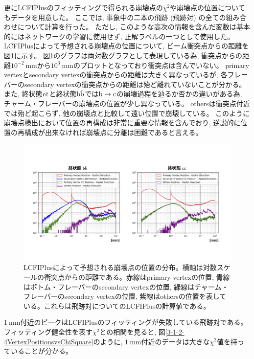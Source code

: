 更にLCFIPlusのフィッティングで得られる崩壊点の$\chi^2$や崩壊点の位置についてもデータを用意した。
ここでは, 事象中の二本の飛跡 (飛跡対) の全ての組み合わせについて計算を行った。
ただし, このような高次の情報を含んだ変数は基本的にはネットワークの学習に使用せず, 正解ラベルの一つとして使用した。
LCFIPlusによって予想される崩壊点の位置について, ビーム衝突点からの距離を図\ref{3-1-2-3VertexPositions}に示す。
図\ref{3-1-2-3VertexPositions}のグラフは両対数グラフとして表現している為, 衝突点からの距離$10^{-2}\ \mathrm{mm}$から$10^{3}\ \mathrm{mm}$のプロットとなっており衝突点は含んでいない。
primary vertexとsecondary vertexの衝突点からの距離は大きく異なっているが, 各フレーバーのsecondary vertexの衝突点からの距離は殆ど離れていないことが分かる。
また, 終状態$\rm c\bar{c}$と終状態$\rm b\bar{b}$では$\rm b \to c$の崩壊過程を辿るか否かの違いがある為, チャーム・フレーバーの崩壊点の位置が少し異なっている。
othersは衝突点付近では殆ど起こらず, 他の崩壊点と比較して遠い位置で崩壊している。
このように崩壊点検出において位置の再構成は非常に重要な情報を含んでおり, 逆説的に位置の再構成が出来なければ崩壊点に分離は困難であると言える。

\begin{figure}[htbp]
 \centering
 \includegraphics[trim = 50 100 50 150, width=1.0\textwidth, clip]{Figure/3Networks/3-1-2-3VertexPositions.png}
 \caption[LCFIPlusによって予想される崩壊点の位置の分布]{LCFIPlusによって予想される崩壊点の位置の分布。横軸は対数スケールの衝突点からの距離である。赤線はprimary vertexの位置, 青線はボトム・フレーバーのsecondary vertexの位置, 緑線はチャーム・フレーバーのsecondary vertexの位置, 紫線はothersの位置を表している。これらは飛跡対についてのLCFIPlusの計算値である。}
 \label{3-1-2-3VertexPositions}
\end{figure}

$1\ \mathrm{mm}$付近のピークはLCFIPlusのフィッティングが失敗している飛跡対である。
フィッティング健全性を表す$\chi^2$との相関を見ると, 図\ref{3-1-2-4VertexPositionsvsChiSquare}のように, $1\ \mathrm{mm}$付近のデータは大きな$\chi^2$値を持っていることが分かる。

